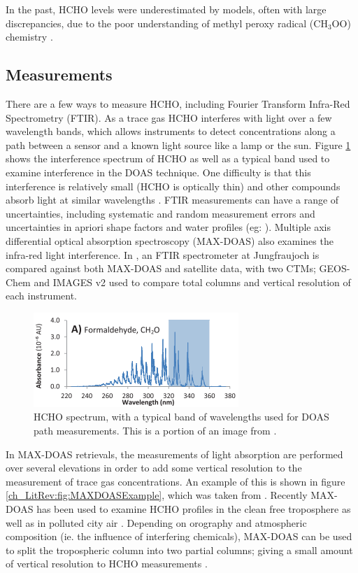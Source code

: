     In the past, HCHO levels were underestimated by models, often with large discrepancies, due to the poor understanding of methyl peroxy radical (CH$_3$OO) chemistry \citep{Wagner2002}.
    
    
  \subsection{Measurements}
    There are a few ways to measure HCHO, including Fourier Transform Infra-Red Spectrometry (FTIR).
    As a trace gas HCHO interferes with light over a few wavelength bands, which allows instruments to detect concentrations along a path between a sensor and a known light source like a lamp or the sun.
    Figure \ref{ch_LitRev:fig:HCHOSpectrum} shows the interference spectrum of HCHO as well as a typical band used to examine interference in the DOAS technique.
    One difficulty is that this interference is relatively small (HCHO is optically thin) and other compounds absorb light at similar wavelengths \citep{Davenport2015}.
    FTIR measurements can have a range of uncertainties, including systematic and random measurement errors and uncertainties in apriori shape factors and water profiles (eg: \citet{Franco2015}).
    Multiple axis differential optical absorption spectroscopy (MAX-DOAS) also examines the infra-red light interference.
    In \citet{Franco2015}, an FTIR spectrometer at Jungfraujoch is compared against both MAX-DOAS and satellite data, with two CTMs; GEOS-Chem and IMAGES v2 used to compare total columns and vertical resolution of each instrument.
    
    \begin{figure}
      \includegraphics{Figures/HCHO/HCHOAbsorbanceDavenport.png}
      \caption{ HCHO spectrum, with a typical band of wavelengths used for DOAS path measurements.
	This is a portion of an image from \citet{Davenport2015}.}
      \label{ch_LitRev:fig:HCHOSpectrum}
    \end{figure}
    
    
    In MAX-DOAS retrievals, the measurements of light absorption are performed over several elevations in order to add some vertical resolution to the measurement of trace gas concentrations.
    An example of this is shown in figure \ref{ch_LitRev:fig:MAXDOASExample}, which was taken from \citet{Lee2015}.
    Recently MAX-DOAS has been used to examine HCHO profiles in the clean free troposphere \citep{Franco2015, Schreier2016} as well as in polluted city air \citep{Lee2015}.
    Depending on orography and atmospheric composition (ie. the influence of interfering chemicals), MAX-DOAS can be used to split the tropospheric column into two partial columns; giving a small amount of vertical resolution to HCHO measurements \citep[eg.]{Franco2015, Lee2015}.
    
